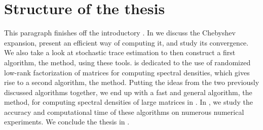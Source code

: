 
\section{Structure of the thesis}
\label{sec:1-introduction-structure}

This paragraph finishes off the introductory .
In  we discuss the Chebyshev expansion, present an
efficient way of computing it, and study its convergence. We also take a
look at stochastic trace estimation to then construct a first algorithm,
the  method, using these tools.
 is dedicated to the use of randomized low-rank factorization
of matrices for computing spectral densities, which gives rise to a second algorithm,
the  method.
Putting the ideas from the two previously discussed algorithms together,
we end up with a fast and general algorithm, the  method, for computing spectral densities
of large matrices in . In ,
we study the accuracy and computational time of these algorithms on numerous
numerical experiments. We conclude the thesis in .
